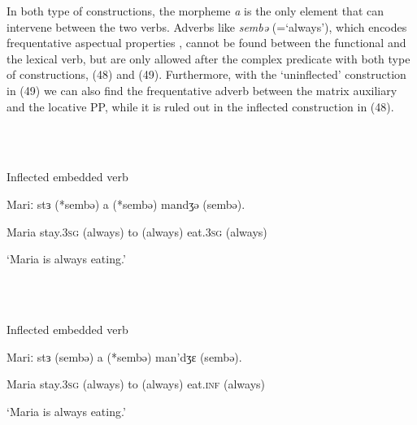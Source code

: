 \documentclass[output=paper]{langsci/langscibook}
\begin{document}
In both type of constructions, the morpheme \textit{a} is the only element that can intervene between the two verbs. Adverbs like \textit{sembə} (=‘always’), which encodes frequentative aspectual properties \citep{Cinque1999}, cannot be found between the functional and the lexical verb, but are only allowed after the complex predicate with both type of constructions, (48) and (49). Furthermore, with the ‘uninflected’ construction in (49) we can also find the frequentative adverb between the matrix auxiliary and the locative PP, while it is ruled out in the inflected construction in (48). 

\ea%
    \label{ex:key:48}
    \gll\\
        \\
    \glt
    \z

          Inflected embedded verb

Mariː  stɜ    (*sembə)  a  (*sembə)   mandʒə   (sembə). 

Maria  stay.\textsc{3sg} (always)  to   (always)  eat.\textsc{3sg} (always)

‘Maria is always eating.’

\ea%
    \label{ex:key:49}
    \gll\\
        \\
    \glt
    \z

          Inflected embedded verb 

Mariː  stɜ     (sembə)   a  (*sembə)  man’dʒɛ  (sembə). 

Maria  stay.\textsc{3sg} (always)  to   (always)  eat.\textsc{inf}\textsubscript{} (always)

‘Maria is always eating.’
\end{document}
